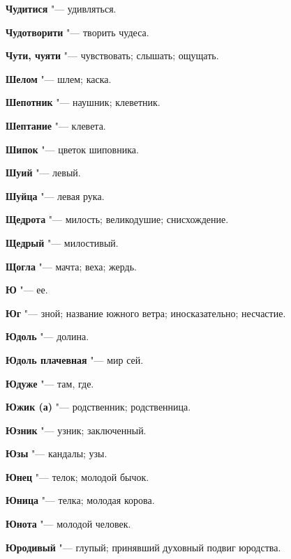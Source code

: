 \begin{mymulticols}
\noindent\textbf{Чудитися} "--- удивляться. 

\noindent\textbf{Чудотворити} "--- творить чудеса. 

\noindent\textbf{Чути, чуяти} "--- чувствовать; слышать; ощущать. 

\bukvaending


\noindent\textbf{Шелом} "--- шлем; каска. 

\noindent\textbf{Шепотник} "--- наушник; клеветник. 

\noindent\textbf{Шептание} "--- клевета. 

\noindent\textbf{Шипок} "--- цветок шиповника. 

\noindent\textbf{Шуий} "--- левый. 

\noindent\textbf{Шуйца} "--- левая рука. 

\bukvaending


\noindent\textbf{Щедрота} "--- милость; великодушие; снисхождение. 

\noindent\textbf{Щедрый} "--- милостивый. 

\noindent\textbf{Щогла} "--- мачта; веха; жердь. 

\bukvaending


\noindent\textbf{Ю} "--- ее. 

\noindent\textbf{Юг} "--- зной; название южного ветра; иносказательно; несчастие. 

\noindent\textbf{Юдоль} "--- долина. 

\noindent\textbf{Юдоль плачевная} "--- мир сей. 

\noindent\textbf{Юдуже} "--- там, где. 

\noindent\textbf{Южик (а)} "--- родственник; родственница. 

\noindent\textbf{Юзник} "--- узник; заключенный. 

\noindent\textbf{Юзы} "--- кандалы; узы. 

\noindent\textbf{Юнец} "--- телок; молодой бычок. 

\noindent\textbf{Юница} "--- телка; молодая корова. 

\noindent\textbf{Юнота} "--- молодой человек. 

\noindent\textbf{Юродивый} "--- глупый; принявший духовный подвиг юродства. 

\bukvaending



\end{mymulticols}
